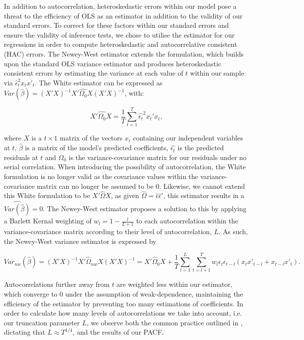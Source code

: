 \documentclass[12pt]{article}
\numberwithin{table}{section}   %
\begin{document}
In addition to autocorrelation, heteroskedastic errors within our model pose a threat to the efficiency of OLS as an estimator in addition to the validity of our standard errors. To correct for these factors within our standard errors and ensure the validity of inference tests, we chose to utilise the \citet{newey} estimator for our regressions in order to compute heteroskedastic and autocorrelative consistent (HAC) errors. The Newey-West estimator extends the \citet{white} formulation, which builds upon the standard OLS variance estimator and produces heteroskedastic consistent errors by estimating the variance at each value of $t$ within our sample via $\hat{\epsilon}^2_tx_tx'_t$. The White estimator can be expressed as $Var(\hat{\beta})=(X'X)^{-1}X'\hat{\Omega_0}X(X'X)^{-1}$, with:

$$
X'\hat{\Omega_0}X=\frac{1}{T}\sum_{t=1}^T\hat{\epsilon_t}^2x_t'x_t,
$$

where $X$ is a $t\times1$ matrix of the vectors $x_t$ containing our independent variables at $t$, $\hat{\beta}$ is a matrix of the model’s predicted coefficients, $\hat{\epsilon_t}$ is the predicted residuals at $t$ and $\Omega_0$ is the variance-covariance matrix for our residuals under no serial correlation. When introducing the possibility of autocorrelation, the White formulation is no longer valid as the covariance values within the variance-covariance matrix can no longer be assumed to be 0. Likewise, we cannot extend this White formulation to be $X'\hat{\Omega}X$, as given $\hat{\Omega}=\hat{\epsilon}\hat{\epsilon}'$, this estimator results in a $\widehat{Var(\hat{\beta})}=0$. The Newey-West estimator proposes a solution to this by applying a Barlett Kernal weighting of $w_l=1-\frac{l}{L+1}$ to each autocorrelation within the variance-covariance matrix according to their level of autocorrelation, $L$. As such, the Newey-West variance estimator is expressed by

$$
\widehat{Var_{nw}(\hat{\beta})}=(X'X)^{-1}X'\hat{\Omega}_{nw}X(X'X)^{-1}=X'\hat{\Omega}_0X+\frac{1}{T}\sum^L_{l=1}\sum^T_{t=l+1}w_l\epsilon_t\epsilon_{t-l}(x_tx'_{t-l}+x_{t-l}x'_t).
$$

Autocorrelations further away from $t$ are weighted less within our estimator, which converge to 0 under the assumption of weak-dependence, maintaining the efficiency of the estimator by preventing too many estimations of coefficients. In order to calculate how many levels of autocorrelations we take into account, i.e. our truncation parameter $L$, we observe both the common practice outlined in \cite{greene}, dictating that $L\approx{T^{1/4}}$, and the results of our PACF.
\end{document}
